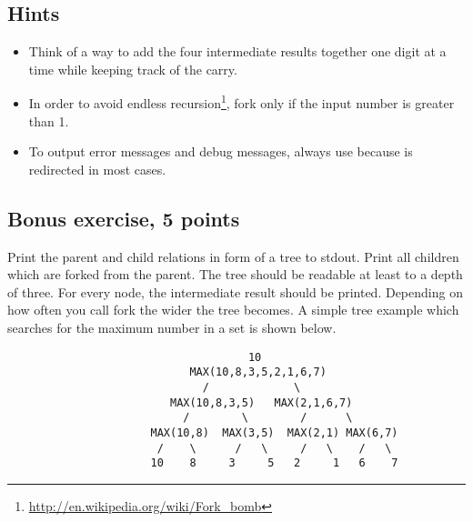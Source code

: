 \clearpage
\subsection*{Hints}

\begin{itemize}
\item Think of a way to add the four intermediate results together
one digit at a time while keeping track of the carry.
\item In order to avoid endless recursion\footnote{\url{http://en.wikipedia.org/wiki/Fork\_bomb}},
fork only if the input number is greater than 1.
\item To output error messages and debug messages, always use
 because  is redirected in most cases.
\end{itemize}

\subsection*{Bonus exercise, 5 points}
Print the parent and child relations in form of a tree to stdout. Print all children which are forked from the parent.
The tree should be readable at least to a depth of three.
For every node, the intermediate result should be printed.\newline
Depending on how often you call fork the wider the tree becomes. A simple tree example which searches for the maximum number in a set is shown below.

\begin{verbatim}
                                     10
                            MAX(10,8,3,5,2,1,6,7)
                              /             \		
                         MAX(10,8,3,5)   MAX(2,1,6,7)
                           /        \        /      \
                      MAX(10,8)  MAX(3,5)  MAX(2,1) MAX(6,7)
                       /    \      /   \     /   \    /   \
                      10    8     3     5   2     1   6    7 
\end{verbatim}
